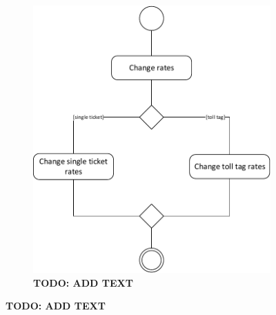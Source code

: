 \begin{figure}
\begin{subfigure}[b]{0.5\textwidth}
	\includegraphics[width=\textwidth]{img/activity_diagrams/change_rates}
	\caption{\textbf{TODO: ADD TEXT}}
	\end{subfigure}
\end{figure}



